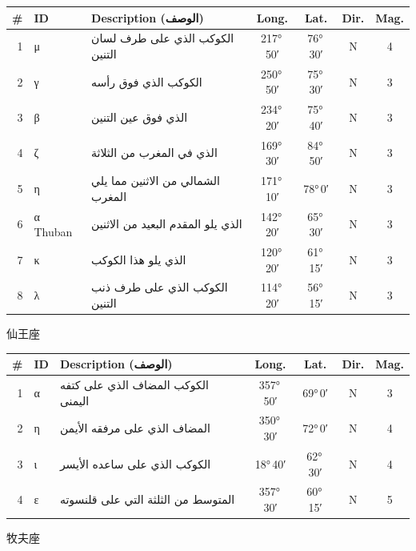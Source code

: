\documentclass[9pt,a4paper]{extarticle}
\newcommand{\ar}[1]{{\arabicfont\textarabic{#1}}}
\begin{document}
\begin{longtable}{r l >{\raggedright\arraybackslash}p{6.7cm} c c c c}
\toprule \# & ID & Description (\ar{الوصف}) & Long. & Lat. & Dir. & Mag.\\ \midrule\endhead
1 & μ & \ar{الكوكب الذي على طرف لسان التنين} & 217°\,50′ & 76°\,30′ & N & 4\\
2 & γ & \ar{الكوكب الذي فوق رأسه} & 250°\,50′ & 75°\,30′ & N & 3\\
3 & β & \ar{الذي فوق عين التنين} & 234°\,20′ & 75°\,40′ & N & 3\\
4 & ζ & \ar{الذي في المغرب من الثلاثة} & 169°\,30′ & 84°\,50′ & N & 3\\
5 & η & \ar{الشمالي من الاثنين مما يلي المغرب} & 171°\,10′ & 78°\,0′ & N & 3\\
6 & α Thuban & \ar{الذي يلو المقدم البعيد من الاثنين} & 142°\,20′ & 65°\,30′ & N & 3\\
7 & κ & \ar{الذي يلو هذا الكوكب} & 120°\,20′ & 61°\,15′ & N & 3\\
8 & λ & \ar{الكوكب الذي على طرف ذنب التنين} & 114°\,20′ & 56°\,15′ & N & 3\\
\bottomrule\end{longtable}
\vspace{4pt}\quad\ar{قيفاوس}\quad 仙王座
\begin{longtable}{r l >{\raggedright\arraybackslash}p{6.7cm} c c c c}
\toprule \# & ID & Description (\ar{الوصف}) & Long. & Lat. & Dir. & Mag.\\ \midrule\endhead
1 & α & \ar{الكوكب المضاف الذي على كتفه اليمنى} & 357°\,50′ & 69°\,0′ & N & 3\\
2 & η & \ar{المضاف الذي على مرفقه الأيمن} & 350°\,30′ & 72°\,0′ & N & 4\\
3 & ι & \ar{الكوكب الذي على ساعده الأيسر} & 18°\,40′ & 62°\,30′ & N & 4\\
4 & ε & \ar{المتوسط من الثلثة التي على قلنسوته} & 357°\,30′ & 60°\,15′ & N & 5\\
\bottomrule\end{longtable}
\vspace{4pt}\quad\ar{العواء}\quad 牧夫座
\end{document}
